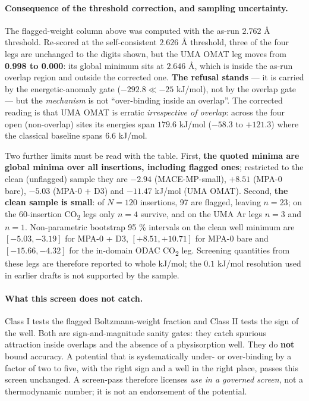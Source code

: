 \paragraph{Consequence of the threshold correction, and sampling
uncertainty.} The flagged-weight column above was computed with the
as-run \(2.762\) Å threshold. Re-scored at the self-consistent
\(2.626\) Å threshold, three of the four legs are unchanged to the
digits shown, but the UMA OMAT leg moves from \textbf{0.998 to 0.000}:
its global minimum sits at \(2.646\) Å, which is inside the as-run
overlap region and outside the corrected one. \textbf{The refusal
stands} --- it is carried by the energetic-anomaly gate
(\(-292.8 \ll -25\) kJ/mol), not by the overlap gate --- but the
\emph{mechanism} is not ``over-binding inside an overlap''. The
corrected reading is that UMA OMAT is erratic \emph{irrespective of
overlap}: across the four open (non-overlap) sites its energies span
\(179.6\) kJ/mol (\(-58.3\) to \(+121.3\)) where the classical baseline
spans \(6.6\) kJ/mol.

Two further limits must be read with the table. First, \textbf{the
quoted minima are global minima over all insertions, including flagged
ones}; restricted to the clean (unflagged) sample they are
\(-2.94\) (MACE-MP-small), \(+8.51\) (MPA-0 bare), \(-5.03\)
(MPA-0 + D3) and \(-11.47\) kJ/mol (UMA OMAT). Second, \textbf{the clean
sample is small}: of \(N = 120\) insertions, 97 are flagged, leaving
\(n = 23\); on the 60-insertion CO\textsubscript{2} legs only \(n = 4\)
survive, and on the UMA Ar legs \(n = 3\) and \(n = 1\). Non-parametric
bootstrap 95 \% intervals on the clean well minimum are
\([-5.03, -3.19]\) for MPA-0 + D3, \([+8.51, +10.71]\) for MPA-0 bare
and \([-15.66, -4.32]\) for the in-domain ODAC CO\textsubscript{2} leg.
Screening quantities from these legs are therefore reported to whole
kJ/mol; the \(0.1\) kJ/mol resolution used in earlier drafts is not
supported by the sample.

\paragraph{What this screen does not catch.} Class I tests the flagged
Boltzmann-weight fraction and Class II tests the sign of the well. Both
are sign-and-magnitude sanity gates: they catch spurious attraction
inside overlaps and the absence of a physisorption well. They do
\textbf{not} bound accuracy. A potential that is systematically
under- or over-binding by a factor of two to five, with the right sign
and a well in the right place, passes this screen unchanged. A
screen-pass therefore licenses \emph{use in a governed screen}, not a
thermodynamic number; it is not an endorsement of the potential.

